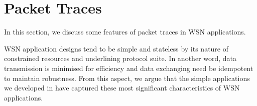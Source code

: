 \section{Packet Traces} \label{Subsec: Traces}

In this section, we discuss some features of packet traces in WSN applications.

%
%

WSN application designs tend to be simple and stateless by its nature of constrained resources and underlining protocol suite. In another word, data transmission is minimised for efficiency and data exchanging need be idempotent to maintain robustness. From this aspect, we argue that the simple applications we developed in  have captured these most significant characteristics of WSN applications.


